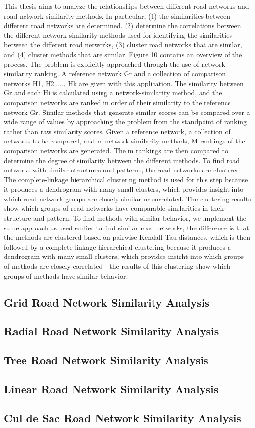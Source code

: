 
This thesis aims to analyze the relationships between different road networks and road network similarity methods. In particular,  (1) the similarities between different road networks are determined, (2) determine the correlations between the different network similarity methods used for identifying the similarities between the different road networks, (3) cluster road networks that are similar, and (4) cluster methods that are similar. Figure 10 contains an overview of the process. The problem is explicitly approached through the use of network-similarity ranking. A reference network Gr and a collection of comparison networks H1, H2,...., Hk are given with this application. The similarity between Gr and each Hi is calculated using a network-similarity method, and the comparison networks are ranked in order of their similarity to the reference network Gr. Similar methods that generate similar scores can be compared over a wide range of values by approaching the problem from the standpoint of ranking rather than raw similarity scores. Given a reference network, a collection of networks to be compared, and m network similarity methods, M rankings of the comparison networks are generated. The m rankings are then compared to determine the degree of similarity between the different methods.
 To find road networks with similar structures and patterns, the road networks are clustered.
The complete-linkage hierarchical clustering method is used for this step because it produces a dendrogram with many small clusters, which provides insight into which road network groups are closely similar or correlated. The clustering results show which groups of road networks have comparable similarities in their structure and pattern. To find methods with similar behavior, we implement the same approach as used earlier to find similar road networks; the difference is that the methods are clustered based on pairwise Kendall-Tau distances, which is then followed by a complete-linkage hierarchical clustering because it produces a dendrogram with many small clusters, which provides insight into which groups of methods are closely correlated—the results of this clustering show which groups of methods have similar behavior.



\subsection{Grid Road Network Similarity Analysis}
\subsection{Radial Road Network Similarity Analysis}
\subsection{Tree Road Network Similarity Analysis}
\subsection{Linear Road Network Similarity Analysis}
\subsection{Cul de Sac Road Network Similarity Analysis}
